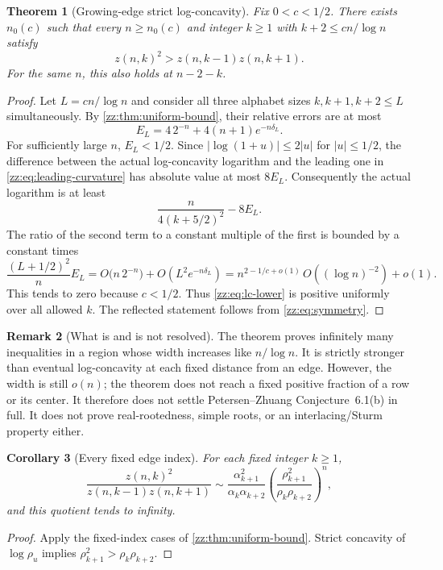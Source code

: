 \documentclass[11pt,a4paper]{article}
\newtheorem{theorem}{Theorem}[section]
\newtheorem{corollary}[theorem]{Corollary}
\theoremstyle{definition}
\newtheorem{remark}[theorem]{Remark}
\begin{document}
\begin{theorem}[Growing-edge strict log-concavity]
\label{zz:thm:edge-lc}
Fix $0<c<1/2$.  There exists $n_0(c)$ such that every $n\ge n_0(c)$ and
integer $k\ge1$ with $k+2\le cn/\log n$ satisfy
\[
 z(n,k)^2>z(n,k-1)z(n,k+1).
\]
For the same $n$, this also holds at $n-2-k$.
\end{theorem}
\begin{proof}
Let $L=cn/\log n$ and consider all three alphabet sizes
$k,k+1,k+2\le L$ simultaneously.  By \cref{zz:thm:uniform-bound}, their
relative errors are at most
\[
 E_L=4\,2^{-n}+4(n+1)e^{-n\delta_L}.
\]
For sufficiently large $n$, $E_L<1/2$.  Since
$|\log(1+u)|\le2|u|$ for $|u|\le1/2$, the difference between the actual
log-concavity logarithm and the leading one in
\eqref{zz:eq:leading-curvature} has absolute value at most $8E_L$.
Consequently the actual logarithm is at least
\begin{equation}\label{zz:eq:lc-lower}
 \frac{n}{4(k+5/2)^2}-8E_L.
\end{equation}
The ratio of the second term to a constant multiple of the first is bounded
by a constant times
\[
 \frac{(L+1/2)^2}{n}E_L
 =O\bigl(n\,2^{-n}\bigr)
   +O\left(L^2e^{-n\delta_L}\right)
 =n^{2-1/c+o(1)}\,O((\log n)^{-2})+o(1).
\]
This tends to zero because $c<1/2$.
Thus \eqref{zz:eq:lc-lower} is positive uniformly over all allowed $k$.
The reflected statement follows from \eqref{zz:eq:symmetry}.
\end{proof}

\begin{remark}[What is and is not resolved]
\label{zz:rem:not-full}
The theorem proves infinitely many inequalities in a region whose width
increases like $n/\log n$.  It is strictly stronger than eventual
log-concavity at each fixed distance from an edge.
However, the width is still $o(n)$; the theorem does not reach a fixed
positive fraction of a row or its center.  It therefore does not settle
Petersen--Zhuang Conjecture~6.1(b) in full.  It does not prove real-rootedness,
simple roots, or an interlacing/Sturm property either.
\end{remark}

\begin{corollary}[Every fixed edge index]
For each fixed integer $k\ge1$,
\[
 \frac{z(n,k)^2}{z(n,k-1)z(n,k+1)}
 \sim\frac{\alpha_{k+1}^2}{\alpha_k\alpha_{k+2}}
 \left(\frac{\rho_{k+1}^2}{\rho_k\rho_{k+2}}\right)^n,
\]
and this quotient tends to infinity.
\end{corollary}
\begin{proof}
Apply the fixed-index cases of \cref{zz:thm:uniform-bound}.
Strict concavity of $\log\rho_u$ implies
$\rho_{k+1}^2>\rho_k\rho_{k+2}$.
\end{proof}
\end{document}
